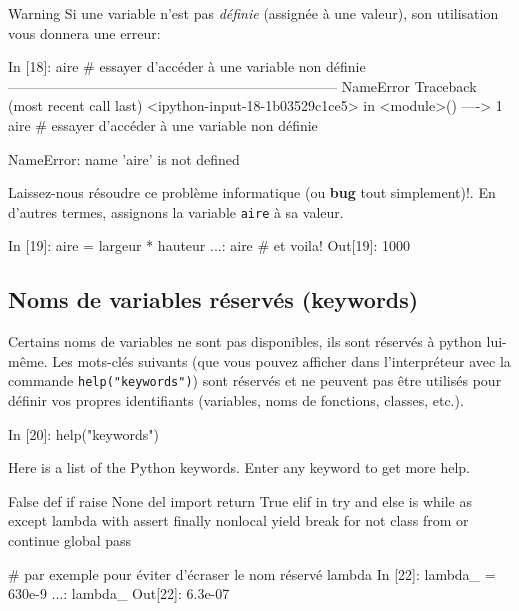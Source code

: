 \documentclass[%
oneside,                 %
final,                   %
10pt]{article}
\begin{document}
\begin{block}{Warning}
Si une variable n'est pas \emph{définie} (assignée à une valeur), son utilisation vous donnera une erreur:

\bipy
In [18]: aire     # essayer d'accéder à une variable non définie
-----------------------------------------------------------------------
NameError                            Traceback (most recent call last)
<ipython-input-18-1b03529c1ce5> in <module>()
----> 1 aire     # essayer d'accéder à une variable non définie

NameError: name 'aire' is not defined
\eipy
\end{block}

Laissez-nous résoudre ce problème informatique (ou \textbf{bug} tout simplement)!. En d'autres termes, assignons la variable \texttt{aire} à sa valeur.

\bipy
In [19]: aire = largeur * hauteur
    ...: aire  # et voila!
Out[19]: 1000
\eipy

\subsection{Noms de variables réservés (keywords)}
Certains noms de variables ne sont pas disponibles, ils sont réservés à python lui-même. Les mots-clés suivants (que vous pouvez afficher dans l'interpréteur avec la commande \texttt{help("keywords")}) sont réservés et ne peuvent pas être utilisés pour définir vos propres identifiants (variables, noms de fonctions, classes, etc.).

\bipy
In [20]: help("keywords")

Here is a list of the Python keywords.  Enter any keyword to get more help.

False               def                 if                  raise
None                del                 import              return
True                elif                in                  try
and                 else                is                  while
as                  except              lambda              with
assert              finally             nonlocal            yield
break               for                 not
class               from                or
continue            global              pass

# par exemple pour éviter d'écraser le nom réservé lambda
In [22]: lambda_ = 630e-9
    ...: lambda_
Out[22]: 6.3e-07
\eipy


\end{document}
